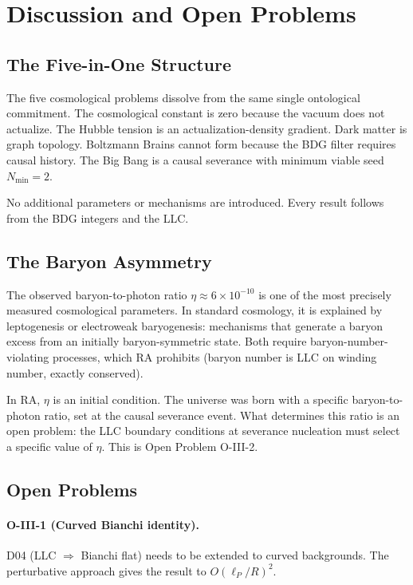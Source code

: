 \documentclass[12pt,a4paper]{article}
\begin{document}
\section{Discussion and Open Problems}\label{sec:discussion}

\subsection{The Five-in-One Structure}

The five cosmological problems dissolve from the same single ontological commitment.  The cosmological constant is zero because the vacuum does not actualize.  The Hubble tension is an actualization-density gradient.  Dark matter is graph topology.  Boltzmann Brains cannot form because the BDG filter requires causal history.  The Big Bang is a causal severance with minimum viable seed $N_{\min}=2$.

No additional parameters or mechanisms are introduced.  Every result follows from the BDG integers and the LLC.

\subsection{The Baryon Asymmetry}

The observed baryon-to-photon ratio $\eta\approx6\times10^{-10}$ is one of the most precisely measured cosmological parameters.  In standard cosmology, it is explained by leptogenesis or electroweak baryogenesis: mechanisms that generate a baryon excess from an initially baryon-symmetric state.  Both require baryon-number-violating processes, which RA prohibits (baryon number is LLC on winding number, exactly conserved).

In RA, $\eta$ is an initial condition.  The universe was born with a specific baryon-to-photon ratio, set at the causal severance event.  What determines this ratio is an open problem: the LLC boundary conditions at severance nucleation must select a specific value of $\eta$.  This is Open Problem O-III-2.

\subsection{Open Problems}

\paragraph{O-III-1 (Curved Bianchi identity).}  D04 (LLC $\Rightarrow$ Bianchi flat) needs to be extended to curved backgrounds.  The perturbative approach gives the result to $O(\ell_P/R)^2$.
\end{document}
